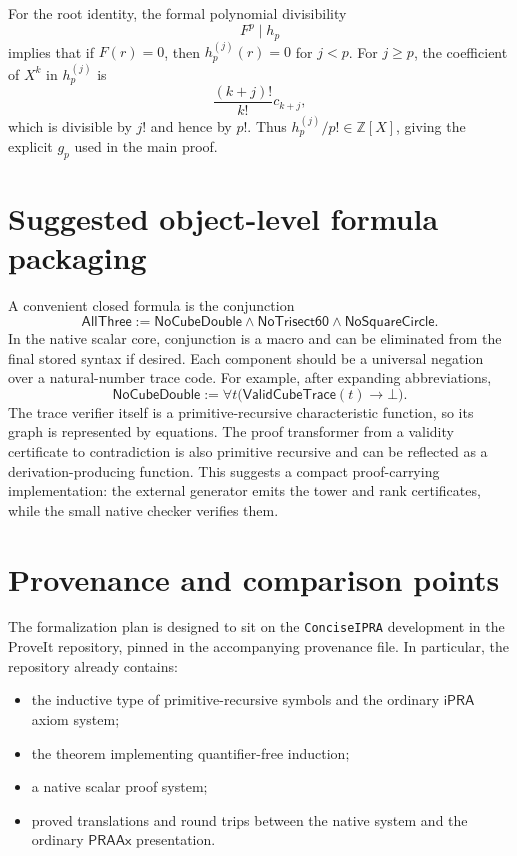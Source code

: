 \documentclass[11pt]{article}
\newcommand{\Z}{\mathbb{Z}}
\newcommand{\ipra}{\mathsf{iPRA}}
\begin{document}
For the root identity, the formal polynomial divisibility
\[
  F^p\mid h_p
\]
implies that if $F(r)=0$, then $h_p^{(j)}(r)=0$ for $j<p$.  For $j\ge p$, the coefficient of $X^k$ in $h_p^{(j)}$ is
\[
  \frac{(k+j)!}{k!}c_{k+j},
\]
which is divisible by $j!$ and hence by $p!$.  Thus $h_p^{(j)}/p!\in\Z[X]$, giving the explicit $g_p$ used in the main proof.

\section{Suggested object-level formula packaging}

A convenient closed formula is the conjunction
\[
  \mathsf{AllThree}:=
  \mathsf{NoCubeDouble}\wedge
  \mathsf{NoTrisect60}\wedge
  \mathsf{NoSquareCircle}.
\]
In the native scalar core, conjunction is a macro and can be eliminated from the final stored syntax if desired.  Each component should be a universal negation over a natural-number trace code.  For example, after expanding abbreviations,
\[
  \mathsf{NoCubeDouble}
   :=\forall t\bigl(\mathsf{ValidCubeTrace}(t)\to\bot\bigr).
\]
The trace verifier itself is a primitive-recursive characteristic function, so its graph is represented by equations.  The proof transformer from a validity certificate to contradiction is also primitive recursive and can be reflected as a derivation-producing function.  This suggests a compact proof-carrying implementation: the external generator emits the tower and rank certificates, while the small native checker verifies them.

\section{Provenance and comparison points}

The formalization plan is designed to sit on the \texttt{ConciseIPRA} development in the ProveIt repository, pinned in the accompanying provenance file.  In particular, the repository already contains:

\begin{itemize}
\item the inductive type of primitive-recursive symbols and the ordinary $\ipra$ axiom system;
\item the theorem implementing quantifier-free induction;
\item a native scalar proof system;
\item proved translations and round trips between the native system and the ordinary $\mathsf{PRAAx}$ presentation.
\end{itemize}
\end{document}
